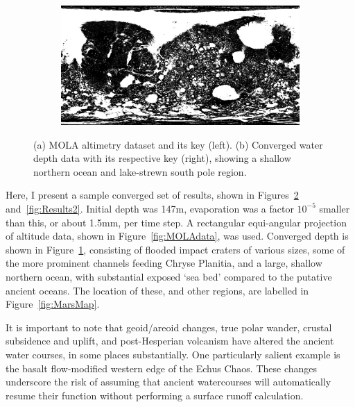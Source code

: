 \documentclass[12pt]{iopart}
\numberwithin{equation}{section}
\begin{document}
\begin{figure}
    \begin{subfigure}[b]{1.0\textwidth}
      \includegraphics[width=\textwidth]{Depth.png}
      \caption{}
      \label{fig:Depth}
    \end{subfigure}
    \caption{\small{(a) MOLA altimetry dataset and its key (left). (b) Converged water depth data with its respective key (right), showing a shallow northern ocean and lake-strewn south pole region.}}\label{fig:Results1}
\end{figure}

Here, I present a sample converged set of results, shown in Figures~\ref{fig:Results1} and~\ref{fig:Results2}. Initial depth was 147m, evaporation was a factor  $10^{-5}$ smaller than this, or about 1.5mm, per time step. A rectangular equi-angular projection of altitude data, shown in Figure~\ref{fig:MOLAdata}, was used. Converged depth is shown in Figure~\ref{fig:Depth}, consisting of flooded impact craters of various sizes, some of the more prominent channels feeding Chryse Planitia\cite{marsmap}, and a large, shallow northern ocean, with substantial exposed `sea bed' compared to the putative ancient oceans. The location of these, and other regions, are labelled in Figure~\ref{fig:MarsMap}.

It is important to note that geoid/areoid changes\cite{geoidchange,geoidchange2}, true polar wander\cite{Perron2007,TPW}, crustal subsidence and uplift\cite{subsidence}, and post-Hesperian volcanism\cite{marsvolcanism} have altered the ancient water courses, in some places substantially. One particularly salient example is the basalt flow-modified western edge of the Echus Chaos. These changes underscore the risk of assuming that ancient watercourses will automatically resume their function without performing a surface runoff calculation.
\end{document}
